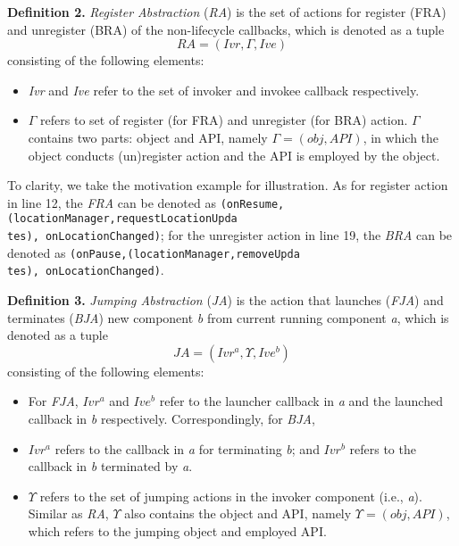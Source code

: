\textbf{Definition 2.} \textit{Register Abstraction} (\textit{RA}) is the set of actions for register (FRA) and unregister (BRA) of the non-lifecycle callbacks, which is denoted as a tuple
\begin{equation}
RA = (Ivr, \Gamma, Ive)
\end{equation}
consisting of the following elements:
\begin{itemize}
\item \textit{Ivr} and \textit{Ive} refer to the set of invoker and invokee callback respectively.
\item $ \Gamma $ refers to set of register (for FRA) and unregister (for BRA) action. $ \Gamma $ contains two parts: object and API, namely $ \Gamma = (obj, API)$, in which the object conducts (un)register action and the API is employed by the object.
\end{itemize}

To clarity, we take the motivation example for illustration. As for register action in line 12, the \textit{FRA} can be denoted as  \texttt{(onResume,(locationManager,requestLocationUpda\\
tes), onLocationChanged)}; for the unregister action in line 19, the \textit{BRA} can be denoted as  \texttt{(onPause,(locationManager,removeUpda\\
tes), onLocationChanged)}.



\textbf{Definition 3.} \textit{Jumping Abstraction} (\textit{JA}) is the action that launches (\textit{FJA}) and terminates (\textit{BJA}) new component \textit{b} from current running component \textit{a}, which is denoted as a tuple 
\begin{equation}
JA = (Ivr^{a}, \Upsilon, Ive^{b})
\end{equation}
consisting of the following elements:
\begin{itemize}
\item For \textit{FJA}, $Ivr^{a}$ and $Ive^{b}$ refer to the launcher callback in \textit{a} and the launched callback in \textit{b} respectively.
Correspondingly, for \textit{BJA}, \item $Ivr^{a}$ refers to the callback in \textit{a} for terminating \textit{b}; and $Ivr^{b}$ refers to the callback in \textit{b} terminated by \textit{a}.
\item $ \Upsilon $ refers to the set of jumping actions in the invoker component (i.e., \textit{a}). Similar as \textit{RA}, $ \Upsilon $ also contains the object and API, namely $ \Upsilon = (obj, API)$, which refers to the jumping object and employed API.
\end{itemize}

